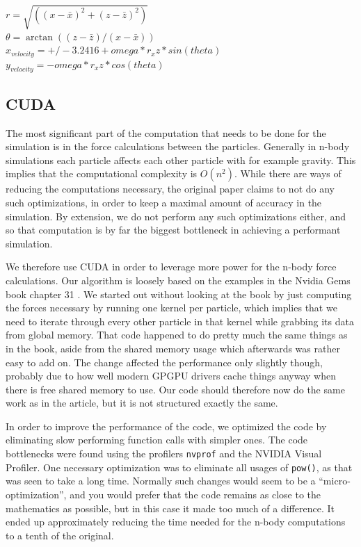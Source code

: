 \documentclass[a4paper]{article}
\begin{document}
\begin{center}
$r = \sqrt{((x - \bar{x})^2 + (z - \bar{z})^2)}$ \\
$\theta = \arctan((z - \bar{z})/(x - \bar{x}))$ \\
$x_{velocity} = +/-3.2416 + omega*r_xz*sin(theta)$ \\
$y_{velocity} = -omega*r_xz*cos(theta)$ \\
\end{center}


\subsection{CUDA}

The most significant part of the computation that needs to be done for the simulation is in the force calculations between the particles.
Generally in n-body simulations each particle affects each other particle with for example gravity.
This implies that the computational complexity is $O(n^2)$.
While there are ways of reducing the computations necessary, the original paper claims to not do any such optimizations, in order to keep a maximal amount of accuracy in the simulation.
By extension, we do not perform any such optimizations either, and so that computation is by far the biggest bottleneck in achieving a performant simulation.

We therefore use CUDA in order to leverage more power for the n-body force calculations.
Our algorithm is loosely based on the examples in the Nvidia Gems book chapter 31 \cite{nvidia_gems}.
We started out without looking at the book by just computing the forces necessary by running one kernel per particle, which implies that we need to iterate through every other particle in that kernel while grabbing its data from global memory.
That code happened to do pretty much the same things as in the book, aside from the shared memory usage which afterwards was rather easy to add on.
The change affected the performance only slightly though, probably due to how well modern GPGPU drivers cache things anyway when there is free shared memory to use.
Our code should therefore now do the same work as in the article, but it is not structured exactly the same.

In order to improve the performance of the code, we optimized the code by eliminating slow performing function calls with simpler ones.
The code bottlenecks were found using the profilers \verb|nvprof| and the NVIDIA Visual Profiler.
One necessary optimization was to eliminate all usages of \verb|pow()|, as that was seen to take a long time.
Normally such changes would seem to be a ``micro-optimization'', and you would prefer that the code remains as close to the mathematics as possible, but in this case it made too much of a difference.
It ended up approximately reducing the time needed for the n-body computations to a tenth of the original.
\end{document}
